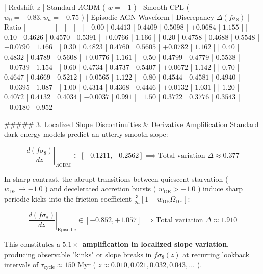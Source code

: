 \documentclass[11pt,a4paper]{article}
\theoremstyle{definition}
\theoremstyle{remark}
\begin{document}
| Redshift $z$ | Standard $\Lambda\text{CDM}$ ( $w = -1$ ) | Smooth CPL ( $w_0 = -0.83, w_a = -0.75$ ) | Episodic AGN Waveform | Discrepancy $\Delta(f\sigma_8)$ | Ratio |
|---|---|---|---|---|---|
| \textbf{$0.00$} | $0.4413$ | $0.4409$ | \textbf{$0.5098$} | $+0.0684$ | $1.155$ |
| \textbf{$0.10$} | $0.4626$ | $0.4570$ | \textbf{$0.5391$} | $+0.0766$ | $1.166$ |
| \textbf{$0.20$} | $0.4758$ | $0.4688$ | \textbf{$0.5548$} | $+0.0790$ | $1.166$ |
| \textbf{$0.30$} | $0.4823$ | $0.4760$ | \textbf{$0.5605$} | $+0.0782$ | $1.162$ |
| \textbf{$0.40$} | $0.4832$ | $0.4789$ | \textbf{$0.5608$} | $+0.0776$ | $1.161$ |
| \textbf{$0.50$} | $0.4799$ | $0.4779$ | \textbf{$0.5538$} | $+0.0739$ | $1.154$ |
| \textbf{$0.60$} | $0.4734$ | $0.4737$ | \textbf{$0.5407$} | $+0.0672$ | $1.142$ |
| \textbf{$0.70$} | $0.4647$ | $0.4669$ | \textbf{$0.5212$} | $+0.0565$ | $1.122$ |
| \textbf{$0.80$} | $0.4544$ | $0.4581$ | \textbf{$0.4940$} | $+0.0395$ | $1.087$ |
| \textbf{$1.00$} | $0.4314$ | $0.4368$ | \textbf{$0.4446$} | $+0.0132$ | $1.031$ |
| \textbf{$1.20$} | $0.4072$ | $0.4132$ | \textbf{$0.4034$} | $-0.0037$ | $0.991$ |
| \textbf{$1.50$} | $0.3722$ | $0.3776$ | \textbf{$0.3543$} | $-0.0180$ | $0.952$ |

\#\#\#\#\# 3. Localized Slope Discontinuities \& Derivative Amplification
Standard dark energy models predict an utterly smooth slope:


\begin{equation}
\left.\frac{d(f\sigma_8)}{dz}\right|_{\Lambda\text{CDM}} \in [-0.1211, +0.2562] \implies \text{Total variation } \Delta \approx 0.377
\end{equation}


In sharp contrast, the abrupt transitions between quiescent starvation ( $w_{\text{DE}} \to -1.0$ ) and decelerated accretion bursts ( $w_{\text{DE}} > -1.0$ ) induce sharp periodic kicks into the friction coefficient $\frac{3}{2a}[1 - w_{\text{DE}}\Omega_{\text{DE}}]$:


\begin{equation}
\left.\frac{d(f\sigma_8)}{dz}\right|_{\text{Episodic}} \in [-0.852, +1.057] \implies \text{Total variation } \Delta \approx 1.910
\end{equation}


This constitutes a \textbf{$5.1\times$ amplification in localized slope variation}, producing observable "kinks" or slope breaks in $f\sigma_8(z)$ at recurring lookback intervals of $\tau_{\text{cycle}} \approx 150\text{ Myr}$ ( $z \approx 0.010, 0.021, 0.032, 0.043, \dots$ ).
\end{document}

